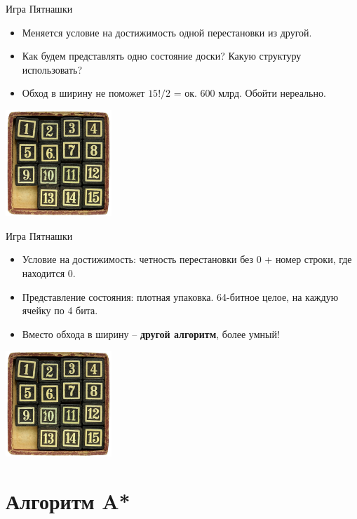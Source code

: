 \documentclass[10pt]{beamer}
\begin{document}
\begin{frame}[fragile]{Игра Пятнашки}
\begin{itemize}
    \item Меняется условие на достижимость одной перестановки из другой.
    \item Как будем представлять одно состояние доски? Какую структуру использовать?
    \item Обход в ширину не поможет $15! / 2$ = ок. 600 млрд. Обойти нереально.
\end{itemize}
\begin{center}
    \includegraphics[width=4cm]{Term_2/Source/images/15puzzle.jpg}
\end{center}
\end{frame}

\begin{frame}[fragile]{Игра Пятнашки}
\begin{itemize}
    \item Условие на достижимость: четность перестановки без 0 + номер строки, где находится 0. 
    \item Представление состояния: плотная упаковка. 64-битное целое, на каждую ячейку по 4 бита.
    \item Вместо обхода в ширину -- \textbf{другой алгоритм}, более умный!
\end{itemize}
\begin{center}
    \includegraphics[width=4cm]{Term_2/Source/images/15puzzle.jpg}
\end{center}
\end{frame}

\section{Алгоритм A*}
\end{document}
